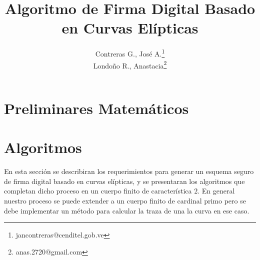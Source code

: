 \documentclass[11pt]{article}
\title{Algoritmo de Firma Digital Basado en Curvas Elípticas}
\author{Contreras G., José A.\footnote{jancontreras@cenditel.gob.ve}\\ Londoño R., Anastacia\footnote{anas.2720@gmail.com}}
\numberwithin{equation}{section} %
\numberwithin{figure}{section} %
\numberwithin{table}{section} %
\begin{document}
\maketitle



\section{Preliminares Matemáticos}





\section{Algoritmos}

En esta sección se describiran los requerimientos para generar un esquema seguro de firma digital basado en curvas elípticas, y se presentaran los algoritmos que completan dicho proceso en un cuerpo finito de característica $2$. En general nuestro proceso se puede extender a un cuerpo finito de cardinal primo pero se debe implementar un método para calcular la traza de una la curva en ese caso.

\end{document}
